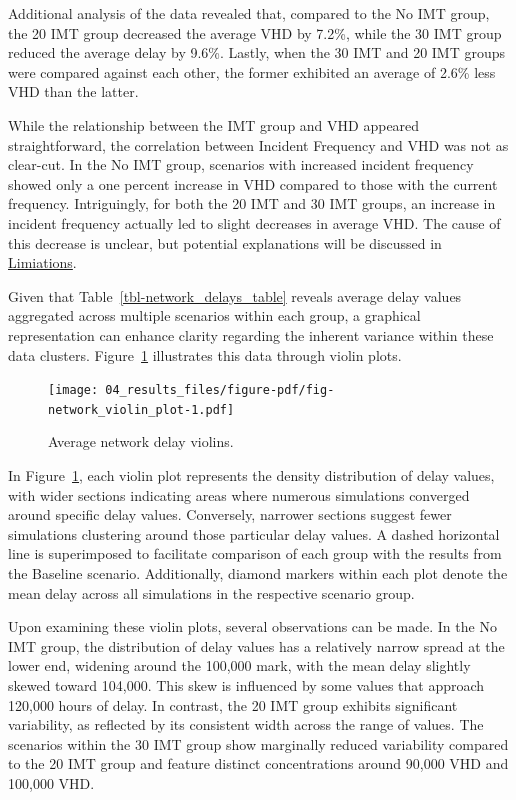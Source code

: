 \documentclass[fancy, oneside, mastersfancy, ms]{byuthesis}
\begin{document}
Additional analysis of the data revealed that, compared to the No IMT
group, the 20 IMT group decreased the average VHD by 7.2\%, while the 30
IMT group reduced the average delay by 9.6\%. Lastly, when the 30 IMT
and 20 IMT groups were compared against each other, the former exhibited
an average of 2.6\% less VHD than the latter.

While the relationship between the IMT group and VHD appeared
straightforward, the correlation between Incident Frequency and VHD was
not as clear-cut. In the No IMT group, scenarios with increased incident
frequency showed only a one percent increase in VHD compared to those
with the current frequency. Intriguingly, for both the 20 IMT and 30 IMT
groups, an increase in incident frequency actually led to slight
decreases in average VHD. The cause of this decrease is unclear, but
potential explanations will be discussed in
\protect\hyperlink{sec-limitations}{Limiations}.

Given that Table~\ref{tbl-network_delays_table} reveals average delay
values aggregated across multiple scenarios within each group, a
graphical representation can enhance clarity regarding the inherent
variance within these data clusters.
Figure~\ref{fig-network_violin_plot} illustrates this data through
violin plots.

\begin{figure}

{\centering \texttt{[image: 04\_results\_files/figure-pdf/fig-network\_violin\_plot-1.pdf]}

}

\caption{\label{fig-network_violin_plot}Average network delay violins.}

\end{figure}

In Figure~\ref{fig-network_violin_plot}, each violin plot represents the
density distribution of delay values, with wider sections indicating
areas where numerous simulations converged around specific delay values.
Conversely, narrower sections suggest fewer simulations clustering
around those particular delay values. A dashed horizontal line is
superimposed to facilitate comparison of each group with the results
from the Baseline scenario. Additionally, diamond markers within each
plot denote the mean delay across all simulations in the respective
scenario group.

Upon examining these violin plots, several observations can be made. In
the No IMT group, the distribution of delay values has a relatively
narrow spread at the lower end, widening around the 100,000 mark, with
the mean delay slightly skewed toward 104,000. This skew is influenced
by some values that approach 120,000 hours of delay. In contrast, the 20
IMT group exhibits significant variability, as reflected by its
consistent width across the range of values. The scenarios within the 30
IMT group show marginally reduced variability compared to the 20 IMT
group and feature distinct concentrations around 90,000 VHD and 100,000
VHD.
\end{document}
